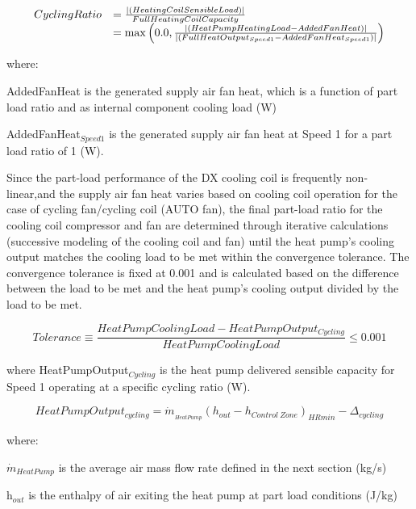 \begin{equation}
  \begin{array}{rl}
    CyclingRatio &= \frac{\left|\left(HeatingCoilSensibleLoad\right)\right|}{FullHeatingCoilCapacity} \\
                 &= \max \left(0.0, \frac{\left|\left(HeatPumpHeatingLoad-AddedFanHeat\right)\right|}{\left|\left(FullHeatOutput_{Speed1}-AddedFanHeat_{Speed1}\right)\right|} \right)
  \end{array}
\label{eq:UnitaryMultiSpeedCyclingRatioCooling}
\end{equation}

where:

AddedFanHeat is the generated supply air fan heat, which is a function of part load ratio and as internal component cooling load (W)

AddedFanHeat\(_{Speed1}\) is the generated supply air fan heat at Speed 1 for a part load ratio of 1 (W).

Since the part-load performance of the DX cooling coil is frequently non-linear,and the supply air fan heat varies based on cooling coil operation for the case of cycling fan/cycling coil (AUTO fan), the final part-load ratio for the cooling coil compressor and fan are determined through iterative calculations (successive modeling of the cooling coil and fan) until the heat pump's cooling output matches the cooling load to be met within the convergence tolerance. The convergence tolerance is fixed at 0.001 and is calculated based on the difference between the load to be met and the heat pump's cooling output divided by the load to be met.

\begin{equation}
  Tolerance \equiv \frac{HeatPumpCoolingLoad - HeatPumpOutput_{Cycling}}{HeatPumpCoolingLoad} \leq 0.001
\end{equation}

where HeatPumpOutput\(_{Cycling}\) is the heat pump delivered sensible capacity for Speed 1 operating at a specific cycling ratio (W).

\begin{equation}
HeatPumpOutpu{t_{cycling}} = {\dot m_{_{HeatPump}}}{\left( {{h_{out}} - {h_{Control~Zone}}} \right)_{HRmin}} - {\Delta_{cycling}}
\end{equation}

where:

\({\dot m_{HeatPump}}\) is the average air mass flow rate defined in the next section (kg/s)

h\(_{out}\) is the enthalpy of air exiting the heat pump at part load conditions (J/kg)

